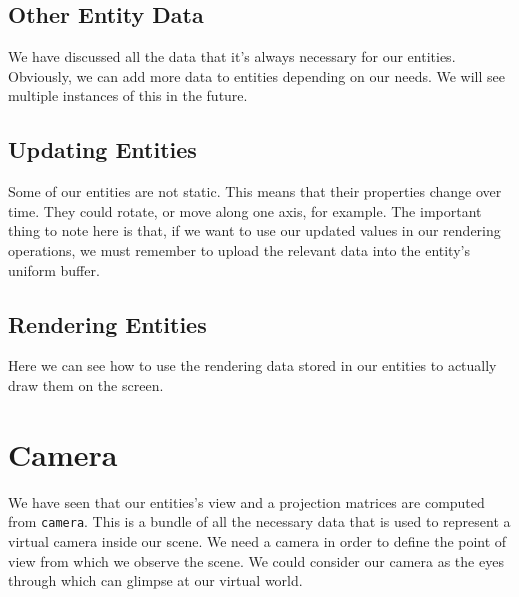 \subsection{Other Entity Data}

We have discussed all the data that it's always necessary for our entities.
Obviously, we can add more data to entities depending on our needs.
We will see multiple instances of this in the future.

\subsection{Updating Entities}

Some of our entities are not static.
This means that their properties change over time.
They could rotate, or move along one axis, for example.
The important thing to note here is that, if we want to use
our updated values in our rendering operations, we must remember
to upload the relevant data into the entity's uniform buffer.

\begin{minipage}{\linewidth}{\noindent}
    
\end{minipage}

\subsection{Rendering Entities}

Here we can see how to use the rendering data stored in our entities
to actually draw them on the screen.

\begin{minipage}{\linewidth}{\noindent}
    
\end{minipage}

\section{Camera}

We have seen that our entities's view and a projection matrices are computed
from \texttt{camera}.
This is a bundle of all the necessary data that is used to represent a virtual
camera inside our scene.
We need a camera in order to define the point of view from which we observe
the scene.
We could consider our camera as the eyes through which can glimpse at
our virtual world.

